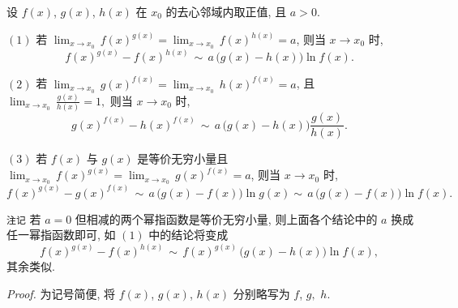 

\begin{theorem}{}
设 $f(x)$, $g(x)$, $h(x)$ 在 $x_{0}$ 的去心邻域内取正值,
且 $a>0$. 

$(1)$ 若 ${\displaystyle \lim_{x\to x_{0}}}\,f(x)^{g(x)}={\displaystyle \lim_{x\to x_{0}}}\,f(x)^{h(x)}=a$,
则当 $x\to x_{0}$ 时, 
$$
f(x)^{g(x)}-f(x)^{h(x)}\,\sim\,a\,\big(g(x)-h(x)\big)\ln f(x).~
$$
 

$(2)$ 若 ${\displaystyle {\displaystyle \lim_{x\to x_{0}}}\,}g(x)^{f(x)}={\displaystyle \lim_{x\to x_{0}}}\,h(x)^{f(x)}=a$,
且 ${\displaystyle \lim_{x\to x_{0}}}\,{\displaystyle \frac{g(x)}{h(x)}}=1,$
则当 $x\to x_{0}$ 时, 
\[
g(x)^{f(x)}-h(x)^{f(x)}\,\sim\,a\,\big(g(x)-h(x)\big)\frac{g(x)}{h(x)}.~
\]

$(3)$ 若 $f(x)$ 与 $g(x)$ 是等价无穷小量且 ${\displaystyle {\displaystyle \lim_{x\to x_{0}}}\,}f(x)^{g(x)}={\displaystyle \lim_{x\to x_{0}}}\,g(x)^{f(x)}=a$,
则当 $x\to x_{0}$ 时, 
\[
f(x)^{g(x)}-g(x)^{f(x)}\,\sim\,a\,\big(g(x)-f(x)\big)\ln g(x)\sim\,a\,\big(g(x)-f(x)\big)\ln f(x).~
\]

\verb`注记`
若 $a=0$ 但相减的两个幂指函数是等价无穷小量, 则上面各个结论中的 $a$ 换成任一幂指函数即可, 如 $(1)$ 中的结论将变成
\[
f(x)^{g(x)}-f(x)^{h(x)}\,\sim\,f(x)^{g(x)}\,\big(g(x)-h(x)\big)\ln f(x),~
\]
其余类似. 

\end{theorem}


\textsl{Proof.} 为记号简便, 将 $f(x)$, $g(x)$, $h(x)$ 分别略写为 $f$, $g,$ $h$. 

